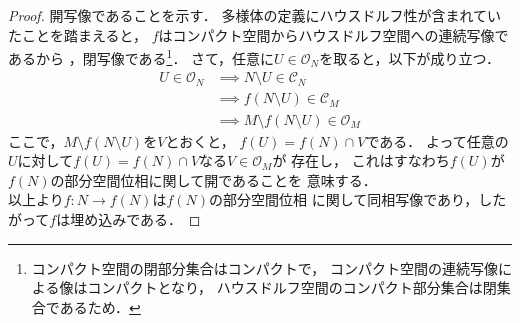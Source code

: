 \documentclass[dvipdfmx,a4paper,11pt]{jsarticle}
\begin{document}
\begin{enumerate}
\begin{proof}
    開写像であることを示す．
    多様体の定義にハウスドルフ性が含まれていたことを踏まえると，
    $f$はコンパクト空間からハウスドルフ空間への連続写像であるから
    ，閉写像である\footnote{
      コンパクト空間の閉部分集合はコンパクトで，
      コンパクト空間の連続写像による像はコンパクトとなり，
      ハウスドルフ空間のコンパクト部分集合は閉集合であるため．
    }．
    さて，任意に$U\in\mathcal{O}_N$を取ると，以下が成り立つ．
    \begin{align}
      U\in\mathcal{O}_N&\implies N\setminus U\in\mathcal{C}_N\\
      &\implies f(N\setminus U)\in\mathcal{C}_M\\
      &\implies M\setminus f(N\setminus U)\in\mathcal{O}_M
    \end{align}
    ここで，$M\setminus f(N\setminus U)$を$V$とおくと，
    $f(U)=f(N)\cap V$である．
    よって任意の$U$に対して$f(U)=f(N)\cap V$なる$V\in\mathcal{O}_M$が
    存在し，
    これはすなわち$f(U)$が$f(N)$の部分空間位相に関して開であることを
    意味する．\\
    以上より$f\colon N\to f(N)$は$f(N)$の部分空間位相
    に関して同相写像であり，したがって$f$は埋め込みである．
  \end{proof}
\end{enumerate}
\end{document}
